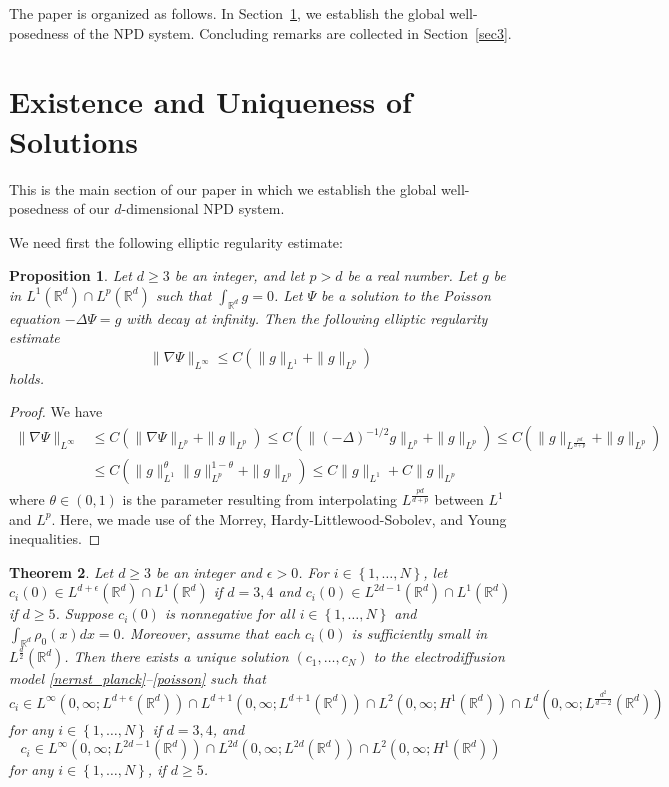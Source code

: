 \documentclass[11pt,reqno]{amsart}
\newcommand{\la}{\label}
\newcommand{\na}{\nabla}
\newcommand{\be}{\begin{equation}}
\newcommand{\ee}{\end{equation}}
\newtheorem{thm}{Theorem}[section]
\newtheorem{prop}[thm]{Proposition}
\newcommand{\R}{\mathbb R}
\begin{document}
The paper is organized as follows. In Section~\ref{sec2}, we establish the global well-posedness of the NPD system. Concluding remarks are collected
in Section~\ref{sec3}.

\section{Existence and Uniqueness of Solutions}\label{sec2}

This is the main section of our paper in which we establish the global well-posedness of our $d$-dimensional NPD system. 

We need first the following elliptic regularity estimate: 

\begin{prop}\label{prop2.1}
    Let $d \ge 3$ be an integer, and let $p > d$ be a real number. Let $g$ be in $L^1(\R^d) \cap L^p(\R^d)$ such that $\int_{\R^d} g = 0$. Let $\Psi$ be a solution to the Poisson equation $- \Delta \Psi = g$  with decay at infinity. Then the following elliptic regularity estimate
    \be
\|\na \Psi\|_{L^{\infty}} \le C\left(\|g\|_{L^1} + \|g\|_{L^p} \right)
    \ee holds.
\end{prop}

\begin{proof}
    We have
    \be 
\begin{aligned}
\|\nabla\Psi\|_{L^\infty} 
&\le C(\|\nabla\Psi\|_{L^p} +\|g\|_{L^p}) 
\le C(\|(-\Delta)^{-1/2}g\|_{L^p} + \|g\|_{L^p}) 
\le C(\|g\|_{L^\frac{pd}{d+p}} + \|g\|_{L^p})
\\&\le C(\|g\|_{L^1}^\theta \|g\|_{L^p}^{1-\theta} + \|g\|_{L^p}) 
\le C\|g\|_{L^1} + C\|g\|_{L^p}
\end{aligned}
\ee where $\theta \in (0,1)$ is the parameter resulting from interpolating $L^{\frac{pd}{d+p}}$ between $L^1$ and $L^p$. Here, we made use of the Morrey, Hardy-Littlewood-Sobolev, and Young inequalities.
\end{proof}

\begin{thm} \label{main} Let $d \ge 3$ be an integer and $\epsilon > 0$. For $i \in \left\{1, \dots, N \right\}$, let $c_i(0) \in L^{d+\epsilon}(\R^d) \cap L^1(\R^d)$ if $d = 3,4$ and   $c_i(0) \in L^{2d-1}(\R^d) \cap L^1(\R^d)$ if $d \ge 5$. Suppose $c_i(0)$ is nonnegative for all $i \in \left\{1, \dots, N \right\}$ and $\int_{\R^d} \rho_0(x) dx = 0$. Moreover, assume that each $c_i(0)$ is sufficiently small in $L^{\frac{d}{2}}(\R^d)$. Then there exists a unique solution $(c_1, \dots, c_N)$ to the electrodiffusion model \eqref{nernst_planck}--\eqref{poisson} such that 
\be \la{reg1}
c_i \in L^{\infty}(0, \infty; L^{d+\epsilon}(\R^d)) \cap L^{d+1}(0, \infty; L^{d+1}(\R^{d})) \cap L^2(0, \infty; H^1(\R^d)) \cap L^d(0, \infty; L^{\frac{d^2}{d-2}}(\R^d))
\ee for any $i \in \left\{1, \dots, N \right\}$ if $d = 3,4$, and 
\be \la{reg2}
c_i \in L^{\infty}(0, \infty; L^{2d-1}(\R^d)) \cap L^{2d}(0, \infty; L^{2d}(\R^{d})) \cap L^2(0, \infty; H^1(\R^d)) 
\ee for any $i \in \left\{1, \dots, N \right\}$, if $d \ge 5$.
\end{thm}
\end{document}
